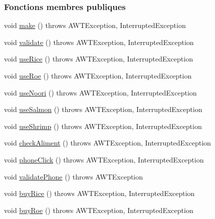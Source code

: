 \subsubsection*{Fonctions membres publiques}
\begin{DoxyCompactItemize}
\item 
void \hyperlink{classTestSushi_1_1src_1_1Suchi_1_1California_ad90a7bbfd16b3d4b7348bde603118e8e}{make} ()  throws A\+W\+T\+Exception, Interrupted\+Exception
\item 
void \hyperlink{classTestSushi_1_1src_1_1Suchi_1_1California_a8bac6f9285749ee10208d2fc4220679f}{validate} ()  throws A\+W\+T\+Exception, Interrupted\+Exception 
\item 
void \hyperlink{classTestSushi_1_1src_1_1Suchi_1_1Recette_a2d78a4575d1295e34210e2f77c01f3f3}{use\+Rice} ()  throws A\+W\+T\+Exception, Interrupted\+Exception
\item 
void \hyperlink{classTestSushi_1_1src_1_1Suchi_1_1Recette_a8967a205e78d02ef7c30fd435fbaa0af}{use\+Roe} ()  throws A\+W\+T\+Exception, Interrupted\+Exception
\item 
void \hyperlink{classTestSushi_1_1src_1_1Suchi_1_1Recette_a10bfe3c71750c84144203a7aa2c341ee}{use\+Noori} ()  throws A\+W\+T\+Exception, Interrupted\+Exception
\item 
void \hyperlink{classTestSushi_1_1src_1_1Suchi_1_1Recette_a87cd9338767df0e5db88e6005f1da984}{use\+Salmon} ()  throws A\+W\+T\+Exception, Interrupted\+Exception
\item 
void \hyperlink{classTestSushi_1_1src_1_1Suchi_1_1Recette_ab2c165554830ba84a392765621604d44}{use\+Shrimp} ()  throws A\+W\+T\+Exception, Interrupted\+Exception
\item 
void \hyperlink{classTestSushi_1_1src_1_1Suchi_1_1Recette_a83f9f5fb6bfe2691974a5e35386e7b8a}{check\+Aliment} ()  throws A\+W\+T\+Exception, Interrupted\+Exception
\item 
void \hyperlink{classTestSushi_1_1src_1_1Suchi_1_1Recette_ad94006ea131c2379a14c50eec870b69b}{phone\+Click} ()  throws A\+W\+T\+Exception, Interrupted\+Exception
\item 
void \hyperlink{classTestSushi_1_1src_1_1Suchi_1_1Recette_a33f0912e1212b01ea1b3787bed28f0fe}{validate\+Phone} ()  throws A\+W\+T\+Exception
\item 
void \hyperlink{classTestSushi_1_1src_1_1Suchi_1_1Recette_aa0fc4c335f6ab3f905f63a16902a6379}{buy\+Rice} ()  throws A\+W\+T\+Exception, Interrupted\+Exception
\item 
void \hyperlink{classTestSushi_1_1src_1_1Suchi_1_1Recette_ad874ba9daf68328d6b65b09e6f16003e}{buy\+Roe} ()  throws A\+W\+T\+Exception, Interrupted\+Exception

\end{DoxyCompactItemize}
